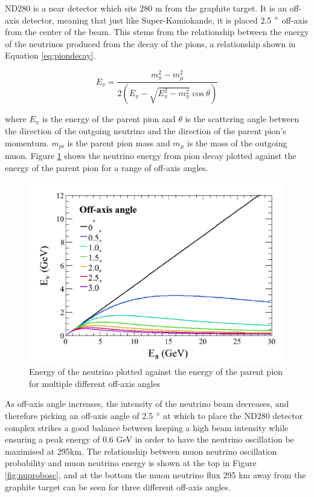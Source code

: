 ND280 is a near detector which sits 280 m from the graphite target. It is an off-axis detector, meaning that just like Super-Kamiokande, it is placed 2.5 $\degree$ off-axis from the center of the beam. This stems from the relationship between the energy of the neutrinos produced from the decay of the pions, a relationship shown in Equation \ref{eq:piondecay}. 

\begin{equation}
    E_{\nu}=\frac{m_{\pi}^{2}-m_{\mu}^{2}}{2\left(E_{\pi}-\sqrt{E_{\pi}^{2}-m_{\pi}^{2}} \cos \theta\right)}
\label{eq:piondecay}
\end{equation}

where $E_{\pi}$ is the energy of the parent pion and $\theta$ is the scattering angle between the direction of the outgoing neutrino and the direction of the parent pion's momentum. $m_{pi}$ is the parent pion mass and $m_{\mu}$ is the mass of the outgoing muon. Figure \ref{fig:energyangle} shows the neutrino energy from pion decay plotted against the energy of the parent pion for a range of off-axis angles. 

\begin{figure}
\includegraphics[width=\textwidth]{Figures/energyangle.png}
\caption{Energy of the neutrino plotted against the energy of the parent pion for multiple different off-axis angles}
    \label{fig:energyangle}
\end{figure}

As off-axis angle increases, the intensity of the neutrino beam decreases, and therefore picking an off-axis angle of 2.5 $\degree$ at which to place the ND280 detector complex strikes a good balance between keeping a high beam intensity while ensuring a peak energy of 0.6 GeV in order to have the neutrino oscillation be maximised at 295km. The relationship between muon neutrino oscillation probability and muon neutrino energy is shown at the top in Figure \ref{fig:nuprobosc}, and at the bottom the muon neutrino flux 295 km away from the graphite target can be seen for three different off-axis angles.


